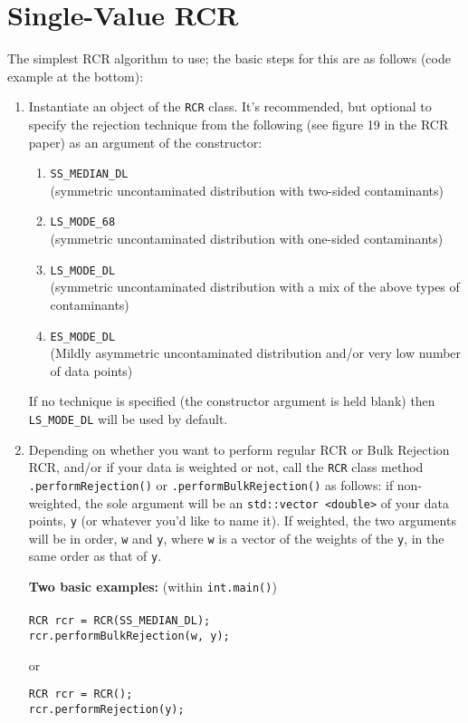 \documentclass[12pt]{article}
\begin{document}
\section{Single-Value RCR}
The simplest RCR algorithm to use; the basic steps for this are as follows (code example at the bottom):
\begin{enumerate}
	\item Instantiate an object of the \texttt{RCR} class. It's recommended, but optional to specify the rejection technique from the following (see figure 19 in the RCR paper) as an argument of the constructor:
	\begin{enumerate}
		\item \texttt{SS\_MEDIAN\_DL} 
		\\(symmetric uncontaminated distribution with two-sided contaminants)
		\item \texttt{LS\_MODE\_68} 
		\\(symmetric uncontaminated distribution with one-sided contaminants)
		\item \texttt{LS\_MODE\_DL}
		\\(symmetric uncontaminated distribution with a mix of the above types of contaminants)
		\item \texttt{ES\_MODE\_DL}
		\\(Mildly asymmetric uncontaminated distribution and/or very low number of data points)
	\end{enumerate}
	If no technique is specified (the constructor argument is held blank) then \texttt{LS\_MODE\_DL} will be used by default.
	\item Depending on whether you want to perform regular RCR or Bulk Rejection RCR, and/or if your data is weighted or not, call the \texttt{RCR} class method \texttt{.performRejection()} or \texttt{.performBulkRejection()} as follows: if non-weighted, the sole argument will be an \texttt{std::vector <double>} of your data points,  \texttt{y} (or whatever you'd like to name it). If weighted, the two arguments will be in order, \texttt{w} and \texttt{y}, where \texttt{w} is a vector of the weights of the \texttt{y}, in the same order as that of \texttt{y}.
	
	\par \textbf{Two basic examples:} (within \texttt{int.main()})
	\\
	\\\texttt{RCR rcr = RCR(SS\_MEDIAN\_DL);}
	\\\texttt{rcr.performBulkRejection(w, y);}
	
	or
	
	\texttt{RCR rcr = RCR();}
	\\\texttt{rcr.performRejection(y);}
\end{enumerate}
\end{document}
